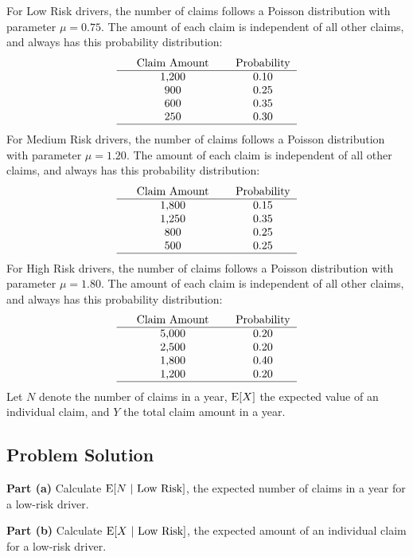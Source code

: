 \documentclass[12pt]{article}
\theoremstyle{definition}
\begin{document}
\bigskip
For Low Risk drivers, the number of claims follows a Poisson distribution with parameter $\mu = 0.75$. The amount of each claim is independent of all other claims, and always has this probability distribution:
$$
\begin{tabular}{ccccc}
& Claim Amount & & Probability\\
\hline
& 1,200 & & 0.10\\
& 900 & & 0.25 \\
& 600 & & 0.35 \\
& 250 & & 0.30 \\
\hline
\end{tabular}
$$
For Medium Risk drivers, the number of claims follows a Poisson distribution with parameter $\mu = 1.20$. The amount of each claim is independent of all other claims, and always has this probability distribution:
$$
\begin{tabular}{ccccc}
& Claim Amount & & Probability\\
\hline
& 1,800 & & 0.15\\
& 1,250 & & 0.35 \\
& 800 & & 0.25 \\
& 500 & & 0.25 \\
\hline
\end{tabular}
$$
For High Risk drivers, the number of claims follows a Poisson distribution with parameter $\mu = 1.80$. The amount of each claim is independent of all other claims, and always has this probability distribution:
$$
\begin{tabular}{ccccc}
& Claim Amount & & Probability\\
\hline
& 5,000 & & 0.20\\
& 2,500 & & 0.20 \\
& 1,800 & & 0.40 \\
& 1,200 & & 0.20 \\
\hline
\end{tabular}
$$
Let $N$ denote the number of claims in a year, $\hbox{E}[X]$ the expected value of an individual claim, and $Y$ the total claim amount in a year.

\newpage
\subsection*{Problem Solution}

\bigskip
\noindent
{\bf Part (a)} Calculate $\hbox{E}[N\ |\ \hbox{Low Risk}]$, the expected number of claims in a year for a low-risk driver.

\vspace{1in}
\noindent
{\bf Part (b)} Calculate $\hbox{E}[X\ |\ \hbox{Low Risk}]$, the expected amount of an individual claim for a low-risk driver.
\end{document}

